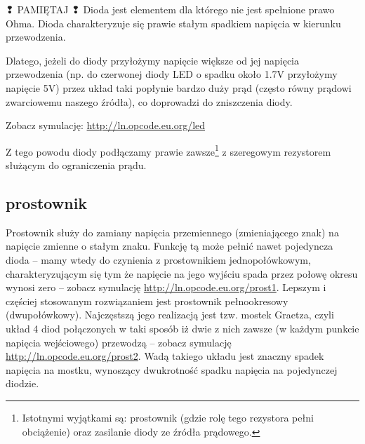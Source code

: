\documentclass{pdfBooklets}
\begin{document}
\begin{ProTip}{{\Symbola ❢} PAMIĘTAJ {\Symbola ❢}}
Dioda jest elementem dla którego nie jest spełnione prawo Ohma. Dioda charakteryzuje się prawie stałym spadkiem napięcia w kierunku przewodzenia.

\vspace{5pt}
Dlatego, jeżeli do diody przyłożymy napięcie większe od jej napięcia przewodzenia (np. do czerwonej diody LED o spadku około 1.7V przyłożymy napięcie 5V) przez układ taki popłynie bardzo duży prąd (często równy prądowi zwarciowemu naszego źródła), co doprowadzi do zniszczenia diody.

Zobacz symulację: \url{http://ln.opcode.eu.org/led}

\vspace{5pt}
Z tego powodu diody podłączamy prawie zawsze\footnote{Istotnymi wyjątkami są: prostownik (gdzie rolę tego rezystora pełni obciążenie) oraz zasilanie diody ze źródła prądowego.} z szeregowym rezystorem służącym do ograniczenia prądu.
\end{ProTip}

\subsection{prostownik}

Prostownik służy do zamiany napięcia przemiennego (zmieniającego znak) na napięcie zmienne o stałym znaku.
Funkcję tą może pełnić nawet pojedyncza dioda – mamy wtedy do czynienia z prostownikiem jednopołówkowym,
	charakteryzującym się tym że napięcie na jego wyjściu spada przez połowę okresu wynosi zero – zobacz symulację \url{http://ln.opcode.eu.org/prost1}.
Lepszym i częściej stosowanym rozwiązaniem jest prostownik pełnookresowy (dwupołówkowy). Najczęstszą jego realizacją jest tzw. mostek Graetza, czyli układ 4 diod połączonych w taki sposób iż dwie z nich zawsze (w każdym punkcie napięcia wejściowego) przewodzą – zobacz symulację \url{http://ln.opcode.eu.org/prost2}.
Wadą takiego układu jest znaczny spadek napięcia na mostku, wynoszący dwukrotność spadku napięcia na pojedynczej diodzie.
\end{document}
